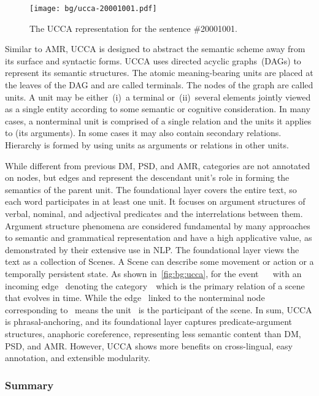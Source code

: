 \begin{figure}[!tbp]
\centering
\texttt{[image: bg/ucca-20001001.pdf]}
\caption{\label{fig:bg:ucca}The UCCA representation for the sentence
  \#20001001.}
\end{figure}

Similar to AMR, UCCA is designed to abstract the semantic scheme away
from its surface and syntactic forms. UCCA uses directed acyclic
graphs~(DAGs) to represent its semantic structures. The atomic
meaning-bearing units are placed at the leaves of the DAG and are
called terminals. The nodes of the graph are called units. A unit may
be either~(i)~a terminal or~(ii)~several elements jointly viewed as a
single entity according to some semantic or cognitive
consideration. In many cases, a nonterminal unit is comprised of a
single relation and the units it applies to (its arguments). In some
cases it may also contain secondary relations. Hierarchy is formed by
using units as arguments or relations in other units.

While different from previous DM, PSD, and AMR, categories are not
annotated on nodes, but edges and represent the descendant unit's role
in forming the semantics of the parent unit. The foundational layer
covers the entire text, so each word participates in at least one
unit. It focuses on argument structures of verbal, nominal, and
adjectival predicates and the interrelations between them. Argument
structure phenomena are considered fundamental by many approaches to
semantic and grammatical representation and have a high applicative
value, as demonstrated by their extensive use in NLP. The foundational
layer views the text as a collection of Scenes. A Scene can describe
some movement or action or a temporally persistent state. As shown
in~\autoref{fig:bg:ucca}, for the event~
~ with an incoming edge~ denoting the
category~~which is the primary relation of a scene
that evolves in time. While the edge~ linked to the
nonterminal node corresponding to~ means the unit~ is the participant of
the scene. In sum, UCCA is phrasal-anchoring, and its foundational
layer captures predicate-argument structures, anaphoric coreference,
representing less semantic content than DM, PSD, and AMR. However,
UCCA shows more benefits on cross-lingual, easy annotation, and
extensible modularity.

\subsubsection{Summary}
\label{ssec:bg:summary-broad-coverage}

